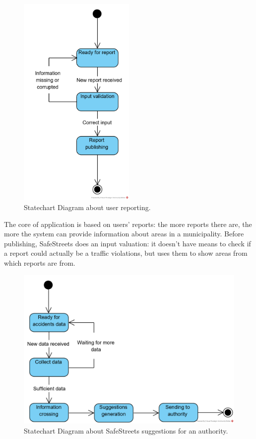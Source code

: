 \documentclass{article}
\begin{document}
			\begin{figure}[H]
				\centering
				\includegraphics[width=0.5\textwidth]{diagrams/statechart_UserSS.png}
				\caption[Statechart Diagram1]{Statechart Diagram about user reporting.}
				\label{fig:statechart_userReporting}
			\end{figure}
			
			The core of application is based on users' reports: the more reports there are, the more the system can provide information about areas in a municipality. Before publishing, SafeStreets does an input valuation: it doesn't have means to check if a report could actually be a traffic violations, but uses them to show areas from which reports are from.
			
			\begin{figure}[H]
				\centering
				\includegraphics {diagrams/statechart_AuthoritySS.png}
				\caption[Statechart Diagram2]{Statechart Diagram about SafeStreets suggestions for an authority.}
				\label{fig:statechart_SuggestionsForAuthority}
			\end{figure}
			
\end{document}
